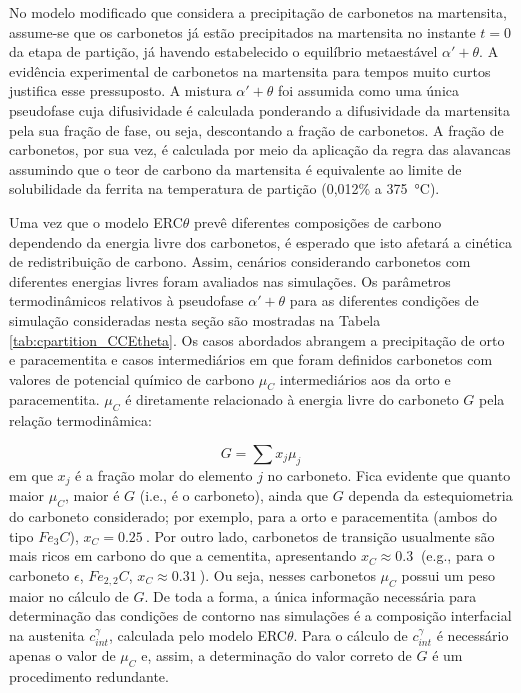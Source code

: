 No modelo modificado que considera a precipitação de carbonetos na martensita, assume-se que os carbonetos já estão precipitados na martensita no instante $t = 0$ da etapa de partição, já havendo estabelecido o equilíbrio metaestável $\alpha' + \theta$.
A evidência experimental de carbonetos na martensita para tempos muito curtos justifica esse pressuposto.
A mistura $\alpha' + \theta$ foi assumida como uma única pseudofase cuja difusividade é calculada ponderando a difusividade da martensita pela sua fração de fase, ou seja, descontando a fração de carbonetos. A fração de carbonetos, por sua vez, é calculada por meio da aplicação da regra das alavancas assumindo 
que o teor de carbono da martensita é equivalente ao limite de solubilidade da ferrita na temperatura de partição (0,012\% a \SI{375}{\degreeCelsius}). 

Uma vez que o modelo ERC$\theta$ prevê diferentes composições de carbono dependendo da energia livre dos carbonetos, é esperado que isto afetará a cinética de redistribuição de carbono. Assim, cenários considerando carbonetos com diferentes energias livres foram avaliados nas simulações. Os parâmetros termodinâmicos relativos à pseudofase $\alpha' + \theta$ para as diferentes condições de simulação consideradas nesta seção são mostradas na Tabela \ref{tab:cpartition_CCEtheta}. Os casos abordados abrangem a precipitação de orto e paracementita e casos intermediários em que foram definidos carbonetos com valores de potencial químico de carbono $\mu_C$ intermediários aos da orto e paracementita. $\mu_C$ é diretamente relacionado à energia livre do carboneto $G$ pela relação termodinâmica:

\begin{equation}
  G = \sum x_j \mu_j
\end{equation} 
%
em que $x_j$ é a fração molar do elemento $j$ no carboneto. Fica evidente que quanto maior $\mu_C$, maior é $G$ (i.e.,  é o carboneto), ainda que $G$ dependa da estequiometria do carboneto considerado; por exemplo, para a orto e paracementita (ambos do tipo $Fe_3C$), $x_C = \SI{0.25}{}$. Por outro lado, carbonetos de transição usualmente são mais ricos em carbono do que a cementita, apresentando $x_C \approx \SI{0.3}{}$ (e.g., para o carboneto $\epsilon$, $Fe_{2,2}C$, $x_C \approx \SI{0.31}{}$). Ou seja, nesses carbonetos $\mu_C$ possui um peso maior no cálculo de $G$. De toda a forma, a única informação necessária para determinação das condições de contorno nas simulações é a composição interfacial na austenita $c^\gamma_{int}$, calculada pelo modelo ERC$\theta$. Para o cálculo de $c^\gamma_{int}$ é necessário apenas o valor de $\mu_C$ e, assim, a determinação do valor correto de $G$ é um procedimento redundante.

